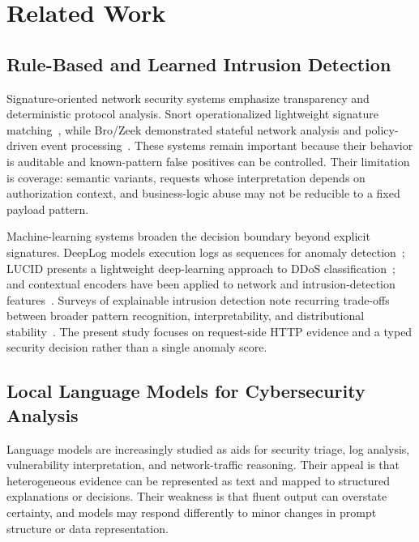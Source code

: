 \section{Related Work}
\label{sec:related}

\subsection{Rule-Based and Learned Intrusion Detection}
Signature-oriented network security systems emphasize transparency and deterministic protocol analysis. Snort operationalized lightweight signature matching~\citep{roesch1999snort}, while Bro/Zeek demonstrated stateful network analysis and policy-driven event processing~\citep{paxson1999bro}. These systems remain important because their behavior is auditable and known-pattern false positives can be controlled. Their limitation is coverage: semantic variants, requests whose interpretation depends on authorization context, and business-logic abuse may not be reducible to a fixed payload pattern.

Machine-learning systems broaden the decision boundary beyond explicit signatures. DeepLog models execution logs as sequences for anomaly detection~\citep{du2017deeplog}; LUCID presents a lightweight deep-learning approach to DDoS classification~\citep{doriguzzi2020lucid}; and contextual encoders have been applied to network and intrusion-detection features~\citep{yang2025bertids}. Surveys of explainable intrusion detection note recurring trade-offs between broader pattern recognition, interpretability, and distributional stability~\citep{neupane2022xids}. The present study focuses on request-side HTTP evidence and a typed security decision rather than a single anomaly score.

\subsection{Local Language Models for Cybersecurity Analysis}
Language models are increasingly studied as aids for security triage, log analysis, vulnerability interpretation, and network-traffic reasoning. Their appeal is that heterogeneous evidence can be represented as text and mapped to structured explanations or decisions. Their weakness is that fluent output can overstate certainty, and models may respond differently to minor changes in prompt structure or data representation.


